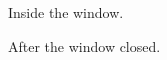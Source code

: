 \documentclass{article}
\begin{document}
\begin{theorem}\label{thm:inside}
Inside the window.
\end{theorem}



\begin{theorem}\label{thm:after}
After the window closed.
\end{theorem}
\end{document}
